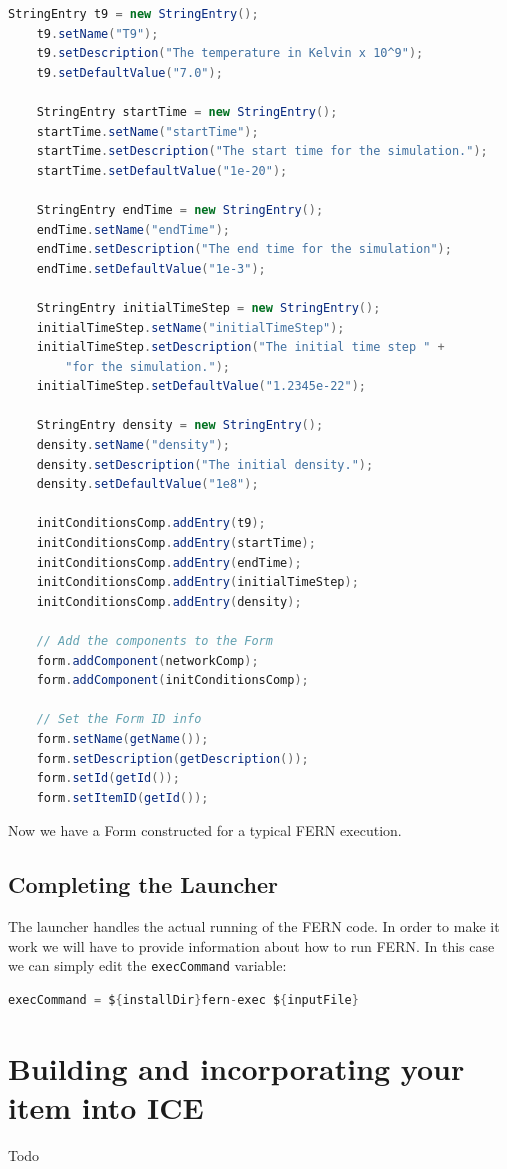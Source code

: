 \documentclass{article}
\begin{document}
\begin{lstlisting}[language=Java]
    StringEntry t9 = new StringEntry();
    t9.setName("T9");
    t9.setDescription("The temperature in Kelvin x 10^9");
    t9.setDefaultValue("7.0");

    StringEntry startTime = new StringEntry();
    startTime.setName("startTime");
    startTime.setDescription("The start time for the simulation.");
    startTime.setDefaultValue("1e-20");

    StringEntry endTime = new StringEntry();
    endTime.setName("endTime");
    endTime.setDescription("The end time for the simulation");
    endTime.setDefaultValue("1e-3");

    StringEntry initialTimeStep = new StringEntry();
    initialTimeStep.setName("initialTimeStep");
    initialTimeStep.setDescription("The initial time step " + 
    	"for the simulation."); 
    initialTimeStep.setDefaultValue("1.2345e-22");

    StringEntry density = new StringEntry();
    density.setName("density");
    density.setDescription("The initial density.");
    density.setDefaultValue("1e8");
    
    initConditionsComp.addEntry(t9);
    initConditionsComp.addEntry(startTime);
    initConditionsComp.addEntry(endTime);
    initConditionsComp.addEntry(initialTimeStep);
    initConditionsComp.addEntry(density);
    
    // Add the components to the Form
    form.addComponent(networkComp);    
    form.addComponent(initConditionsComp);
    
    // Set the Form ID info
    form.setName(getName());
    form.setDescription(getDescription());
    form.setId(getId());
    form.setItemID(getId());
\end{lstlisting}

Now we have a Form constructed for a typical FERN execution.

\subsection{Completing the Launcher}
The launcher handles the actual running of the FERN code.  
In order to make it work we will have to provide information 
about how to run FERN.  In this case we can simply edit the \texttt{execCommand} variable:

\begin{lstlisting}[language=java]
execCommand = ${installDir}fern-exec ${inputFile}
\end{lstlisting}

\section{Building and incorporating your item into ICE}
Todo
\end{document}
